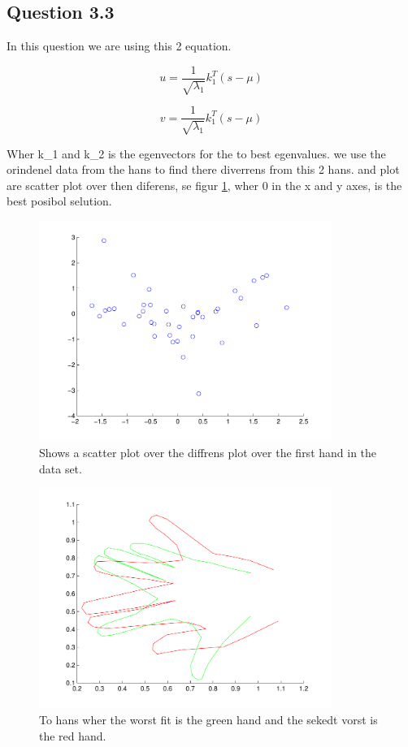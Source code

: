 \subsection*{Question 3.3}
In this question we are using this 2 equation.

\begin{equation}
	u = \frac{1}{\sqrt{\lambda_1}}k^T_1(s-\mu)
\end{equation}

\begin{equation}
	v = \frac{1}{\sqrt{\lambda_1}}k^T_1(s-\mu)
\end{equation}

Wher k_1 and k_2 is the egenvectors for the to best egenvalues. we use the orindenel data from the hans to find there diverrens from this 2 hans. and plot are scatter plot over then diferens, se figur \ref{fig:q33scatter}, wher 0 in the x and y axes, is the best posibol selution.

\begin{figure}[!htbp]
  \centering
  \includegraphics[width=0.85\textwidth]{./images/q33_scatter}
  \caption{Shows a scatter plot over the diffrens  plot over the first hand in the data set.}
  \label{fig:q33scatter}
\end{figure}



\begin{figure}[!htbp]
  \centering
  \includegraphics[width=0.85\textwidth]{./images/q33}
  \caption{To hans wher the worst fit is the green hand and the sekedt vorst is the red hand.}
  \label{fig:q33}
\end{figure}




